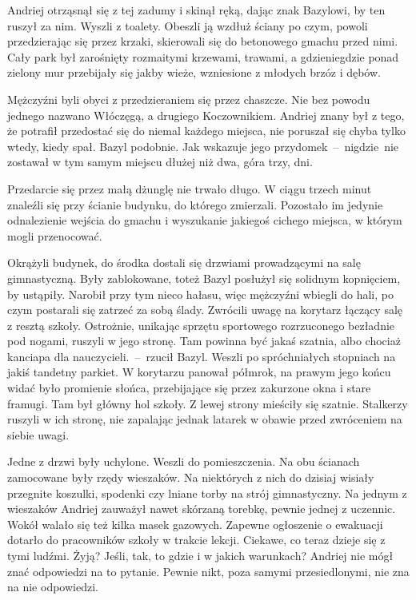 \documentclass[../MAIN.tex]{subfiles}
\begin{document}
Andriej otrząsnął się z tej zadumy i skinął ręką, dając znak Bazylowi, by ten ruszył za nim. Wyszli z toalety. Obeszli ją wzdłuż ściany po czym, powoli przedzierając się przez krzaki, skierowali się do betonowego gmachu przed nimi. Cały park był zarośnięty rozmaitymi krzewami, trawami, a gdzieniegdzie ponad zielony mur przebijały się jakby wieże, wzniesione z młodych brzóz i dębów.

Mężczyźni byli obyci z przedzieraniem się przez chaszcze. Nie bez powodu jednego nazwano Włóczęgą, a drugiego Koczownikiem. Andriej znany był z tego, że potrafił przedostać się do niemal każdego miejsca, nie poruszał się chyba tylko wtedy, kiedy spał. Bazyl podobnie. Jak wskazuje jego przydomek~--~nigdzie~nie zostawał w tym samym miejscu dłużej niż dwa, góra trzy, dni.

Przedarcie się przez małą dżunglę nie trwało długo. W ciągu trzech minut znaleźli się przy ścianie budynku, do którego zmierzali. Pozostało im jedynie odnalezienie wejścia do gmachu i wyszukanie jakiegoś cichego miejsca, w którym mogli przenocować.

Okrążyli budynek, do środka dostali się drzwiami prowadzącymi na salę gimnastyczną. Były zablokowane, toteż Bazyl posłużył się solidnym kopnięciem, by ustąpiły. Narobił przy tym nieco hałasu, więc mężczyźni wbiegli do hali, po czym postarali się zatrzeć za sobą ślady. Zwrócili uwagę na korytarz łączący salę z resztą szkoły. Ostrożnie, unikając sprzętu sportowego rozrzuconego bezładnie pod nogami, ruszyli w jego stronę.
\sx
Tam powinna być jakaś szatnia, albo chociaż kanciapa dla nauczycieli.~--~rzucił Bazyl.
\qm
Weszli po spróchniałych stopniach na jakiś tandetny parkiet. W korytarzu panował półmrok, na prawym jego końcu widać było promienie słońca, przebijające się przez zakurzone okna i stare framugi. Tam był główny hol szkoły. Z lewej strony mieściły się szatnie. Stalkerzy ruszyli w ich stronę, nie zapalając jednak latarek w obawie przed zwróceniem na siebie uwagi.

Jedne z drzwi były uchylone. Weszli do pomieszczenia. Na obu ścianach zamocowane były rzędy wieszaków. Na niektórych z nich do dzisiaj wisiały przegnite koszulki, spodenki czy lniane torby na strój gimnastyczny. Na jednym z wieszaków Andriej zauważył nawet skórzaną torebkę, pewnie jednej z uczennic. Wokół walało się też kilka masek gazowych. Zapewne ogłoszenie o ewakuacji dotarło do pracowników szkoły w trakcie lekcji. Ciekawe, co teraz dzieje się z tymi ludźmi. Żyją? Jeśli, tak, to gdzie i w jakich warunkach? Andriej nie mógł znać odpowiedzi na to pytanie. Pewnie nikt, poza samymi przesiedlonymi, nie zna na nie odpowiedzi.
\end{document}
